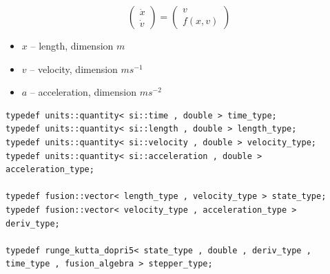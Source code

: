\begin{frame}[fragile]

 $$
 \left( \begin{array}{c} \dot{x} \\ \dot{v} \end{array} \right) 
= \left( \begin{array}{l} v \\ f(x,v) \end{array} \right)
$$
 \begin{itemize}
  \item $x$ -- length, dimension $m$
  \item $v$ -- velocity, dimension $m s^{-1}$
  \item $a$ -- acceleration, dimension $m s^{-2}$
 \end{itemize}

 \begin{lstlisting}[basicstyle=\tiny\ttfamily]
typedef units::quantity< si::time , double > time_type;
typedef units::quantity< si::length , double > length_type;
typedef units::quantity< si::velocity , double > velocity_type;
typedef units::quantity< si::acceleration , double > acceleration_type;

typedef fusion::vector< length_type , velocity_type > state_type;
typedef fusion::vector< velocity_type , acceleration_type > deriv_type;

typedef runge_kutta_dopri5< state_type , double , deriv_type , time_type , fusion_algebra > stepper_type;
 \end{lstlisting}

 

\end{frame}


